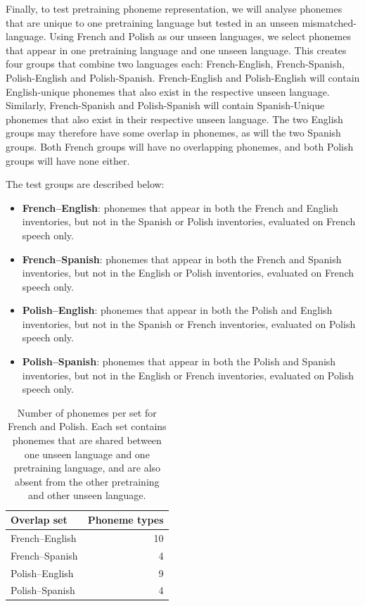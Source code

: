 Finally, to test pretraining phoneme representation, we will analyse phonemes that are unique to one pretraining language but tested in an unseen mismatched-language. Using French and Polish as our unseen languages, we select phonemes that appear in one pretraining language and one unseen language. This creates four groups that combine two languages each: French-English, French-Spanish, Polish-English and Polish-Spanish. French-English and Polish-English will contain English-unique phonemes that also exist in the respective unseen language. Similarly, French-Spanish and Polish-Spanish will contain Spanish-Unique phonemes that also exist in their respective unseen language. The two English groups may therefore have some overlap in phonemes, as will the two Spanish groups. Both French groups will have no overlapping phonemes, and both Polish groups will have none either.

The test groups are described below:
\begin{itemize}
    \item \textbf{French--English}: phonemes that appear in both the French and English inventories, but not in the Spanish or Polish inventories, evaluated on French speech only.
    \item \textbf{French--Spanish}: phonemes that appear in both the French and Spanish inventories, but not in the English or Polish inventories, evaluated on French speech only.
    \item \textbf{Polish--English}: phonemes that appear in both the Polish and English inventories, but not in the Spanish or French inventories, evaluated on Polish speech only.
    \item \textbf{Polish--Spanish}: phonemes that appear in both the Polish and Spanish inventories, but not in the English or French inventories, evaluated on Polish speech only.
\end{itemize}

\begin{table}[h]
    \centering
    \begin{tabular}{l r}
        \hline
        Overlap set      & Phoneme types \\
        \hline
        French--English  & 10 \\
        French--Spanish  & 4  \\
        Polish--English  & 9  \\
        Polish--Spanish  & 4  \\
        \hline
    \end{tabular}
    \caption{Number of phonemes per set for French and Polish. Each set contains phonemes that are shared between one unseen language and one pretraining language, and are also absent from the other pretraining and other unseen language.}
    \label{ed_tab:cross_overlap_sizes_fr_pl}
\end{table}

